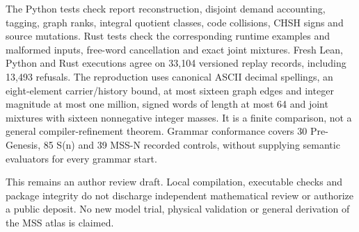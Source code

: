 \documentclass[
  11pt,
]{article}
\begin{document}
The Python tests check report reconstruction, disjoint demand
accounting, tagging, graph ranks, integral quotient classes, code
collisions, CHSH signs and source mutations. Rust tests check the
corresponding runtime examples and malformed inputs, free-word
cancellation and exact joint mixtures. Fresh Lean, Python and Rust
executions agree on 33,104 versioned replay records, including 13,493
refusals. The reproduction uses canonical ASCII decimal spellings, an
eight-element carrier/history bound, at most sixteen graph edges and
integer magnitude at most one million, signed words of length at most 64
and joint mixtures with sixteen nonnegative integer masses. It is a
finite comparison, not a general compiler-refinement theorem. Grammar
conformance covers 30 Pre-Genesis, 85 S(n) and 39 MSS-N recorded
controls, without supplying semantic evaluators for every grammar start.

This remains an author review draft. Local compilation, executable
checks and package integrity do not discharge independent mathematical
review or authorize a public deposit. No new model trial, physical
validation or general derivation of the MSS atlas is claimed.
\end{document}
